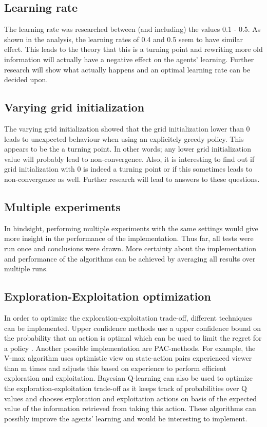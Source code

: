 \documentclass{article}
\begin{document}
\subsection{Learning rate}
The learning rate was researched between (and including) the values 0.1 - 0.5.  As shown in the analysis, the learning rates of 0.4 and 0.5 seem to have similar effect. This leads to the theory that this is a turning point and rewriting more old information will actually have a negative effect on the agents' learning. Further research will show what actually happens and an optimal learning rate can be decided upon.

\subsection{Varying grid initialization}
The varying grid initialization showed that the grid initialization lower than 0 leads to unexpected behaviour when using an explicitely greedy policy. This appears to be the a turning point. In other words; any lower grid initialization value will probably lead to non-convergence. Also, it is interesting to find out if grid initialization with 0 is indeed a turning point or if this sometimes leads to non-convergence as well. Further research will lead to answers to these questions. 

\subsection{Multiple experiments}
In hindsight, performing multiple experiments with the same settings would give more insight in the performance of the implementation. Thus far, all tests were run once and conclusions were drawn. More certainty about the implementation and performance of the algorithms can be achieved by averaging all results over multiple runs.

\subsection{Exploration-Exploitation optimization}
In order to optimize the exploration-exploitation trade-off, different techniques can be implemented. Upper confidence methods use a upper confidence bound on the probability that an action is optimal which can be used to limit the regret for a policy \cite{auer2009near}. Another possible implementation are PAC-methods. For example, the V-max\cite{rao:aamas12} algorithm uses optimistic view on state-action pairs experienced viewer than m times and adjusts this based on experience to perform efficient exploration and exploitation. Bayesian Q-learning \cite{dearden1998bayesian} can also be used to optimize the exploration-exploitation trade-off as it keeps track of probabilities over Q values and chooses exploration and exploitation actions on basis of the expected value of the information retrieved from taking this action.
These algorithms can possibly improve the agents' learning and would be interesting to implement.
\pagebreak
\end{document}
